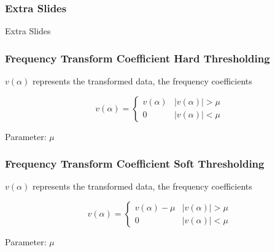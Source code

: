 \documentclass{beamer}
\begin{document}

\begin{frame}
\begin{center}
\frametitle{Extra Slides}

Extra Slides

\end{center}
\end{frame}


\begin{frame}
\begin{center}
\frametitle{Frequency Transform Coefficient Hard Thresholding}

$v\left(\alpha\right)$ represents the transformed data, the frequency coefficients

\begin{displaymath}
v\left(\alpha\right) = 
\begin{cases}
v\left(\alpha\right) & \lvert v\left(\alpha\right)\rvert > \mu \\
0 & \lvert v\left(\alpha\right)\rvert < \mu
\end{cases}
\end{displaymath}

$ $\\

$ $\\

Parameter: $\mu$

\end{center}
\end{frame}


\begin{frame}
\begin{center}
\frametitle{Frequency Transform Coefficient Soft Thresholding}

$v\left(\alpha\right)$ represents the transformed data, the frequency coefficients

\begin{displaymath}
v\left(\alpha\right) = 
\begin{cases}
v\left(\alpha\right) - \mu & \lvert v\left(\alpha\right)\rvert > \mu \\
0 & \lvert v\left(\alpha\right)\rvert < \mu
\end{cases}
\end{displaymath}

$ $\\

$ $\\

Parameter: $\mu$

\end{center}
\end{frame}


\begin{frame}
\titlepage %
\end{frame}


\end{document}
